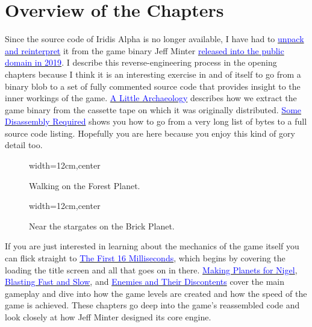 \section*{Overview of the Chapters}
Since the source code of Iridis Alpha is no longer available, I have had to
\href{https://github.com/mwenge/iridisalpha}{\textcolor{blue}{unpack and
reinterpret}} it from the game binary Jeff Minter
\href{https://www.llamasoftarchive.org/oldsite/llamasoft/cbm64/IridisAlpha.zip}{\textcolor{blue}{released
into the public domain in 2019}}. I describe this reverse-engineering process
in the opening chapters because I think it is an interesting exercise in and of
itself to go from a binary blob to a set of fully commented source code that
provides insight to the inner workings of the game.
\hyperref[sec:archaeo]{\textcolor{blue}{A Little Archaeology}} describes how we
extract the game binary from the cassette tape on which it was originally
distributed. \hyperref[sec:disassembly]{\textcolor{blue}{Some Disassembly
Required}} shows you how to go from a very long list of bytes to a full source
code listing. Hopefully you are here because you enjoy this kind of gory detail
too.

\clearpage

\begin{figure}[H]
  {
    \begin{adjustbox}{width=12cm,center}
    \end{adjustbox}
  }\caption*{Walking on the Forest Planet.}
\end{figure}
\vspace{-0.5cm}
\begin{figure}[H]
  {
    \begin{adjustbox}{width=12cm,center}
    \end{adjustbox}
  }\caption*{Near the stargates on the Brick Planet.}
\end{figure}
\clearpage
If you are just interested in learning about the mechanics of the game itself
you can flick straight to \hyperref[sec:first16]{\textcolor{blue}{The First 16
Milliseconds}}, which begins by covering the loading the title
screen and all that goes on in there.
\hyperref[sec:planets]{\textcolor{blue}{Making Planets for Nigel}},
\hyperref[sec:blast]{\textcolor{blue}{Blasting Fast and Slow}}, and
\hyperref[sec:level]{\textcolor{blue}{Enemies and Their Discontents}} cover the
main gameplay and dive into how the game levels are created and how the speed
of the game is achieved. These chapters go deep into the game's reassembled
code and look closely at how Jeff Minter designed its core engine.

